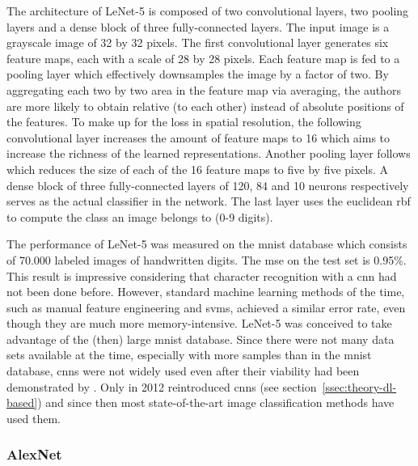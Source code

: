 \documentclass[draft,final]{vutinfth} %
\begin{document}
The architecture of LeNet-5 is composed of two convolutional layers,
two pooling layers and a dense block of three fully-connected
layers. The input image is a grayscale image of 32 by 32 pixels. The
first convolutional layer generates six feature maps, each with a
scale of 28 by 28 pixels. Each feature map is fed to a pooling layer
which effectively downsamples the image by a factor of two. By
aggregating each two by two area in the feature map via averaging, the
authors are more likely to obtain relative (to each other) instead of
absolute positions of the features. To make up for the loss in spatial
resolution, the following convolutional layer increases the amount of
feature maps to 16 which aims to increase the richness of the learned
representations. Another pooling layer follows which reduces the size
of each of the 16 feature maps to five by five pixels. A dense block
of three fully-connected layers of 120, 84 and 10 neurons respectively
serves as the actual classifier in the network. The last layer uses
the euclidean \gls{rbf} to compute the class an image belongs to (0-9
digits).

The performance of LeNet-5 was measured on the \gls{mnist} database
which consists of 70.000 labeled images of handwritten digits. The
\gls{mse} on the test set is 0.95\%. This result is impressive
considering that character recognition with a \gls{cnn} had not been
done before. However, standard machine learning methods of the time,
such as manual feature engineering and \glspl{svm}, achieved a similar
error rate, even though they are much more memory-intensive. LeNet-5
was conceived to take advantage of the (then) large \gls{mnist}
database. Since there were not many data sets available at the time,
especially with more samples than in the \gls{mnist} database,
\glspl{cnn} were not widely used even after their viability had been
demonstrated by \textcite{lecun1998}. Only in 2012
\textcite{krizhevsky2012} reintroduced \glspl{cnn} (see
section~\ref{ssec:theory-dl-based}) and since then most
state-of-the-art image classification methods have used them.

\subsubsection{AlexNet}
\label{sssec:theory-alexnet}
\end{document}
